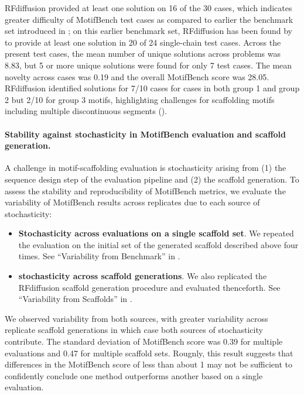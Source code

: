 RFdiffusion provided at least one solution on 16 of the 30 cases, which indicates greater difficulty of MotifBench test cases as compared to earlier the benchmark set introduced in \citep{watson2022broadly};
on this earlier benchmark set, RFdiffusion has been found by \citet{watson2022broadly, yim2024improved,zhang2023protein} to provide at least one solution in 20 of 24 single-chain test cases.  Across the present test cases, the mean number of unique solutions across problems was 8.83, but 5 or more unique solutions were found for only 7 test cases. The mean novelty across cases was 0.19 and the overall MotifBench score was 28.05. RFdiffusion identified solutions for 7/10 cases for cases in both group 1 and group 2 but 2/10 for group 3 motifs, highlighting challenges for scaffolding motifs including multiple discontinuous segments ().


\paragraph{Stability against stochasticity in MotifBench evaluation and scaffold generation.} A challenge in motif-scaffolding evaluation is stochasticity arising from (1) the sequence design step of the evaluation pipeline and (2) the scaffold generation. To assess the stability and reproducibility of MotifBench metrics, we evaluate the variability of MotifBench results across replicates due to each source of stochasticity:
{\begin{itemize}
    \item \textbf{Stochasticity across evaluations on a single scaffold set}. We repeated the evaluation on the initial set of the generated scaffold described above four times. See ``Variability from Benchmark'' in .
    \item \textbf{stochasticity across scaffold generations}. We also replicated the RFdiffusion scaffold generation procedure and evaluated thenceforth. See ``Variability from Scaffolds'' in .
\end{itemize}}

We observed variability from both sources, with greater variability across replicate scaffold generations in which case both sources of stochasticity contribute. The standard deviation of MotifBench score was 0.39 for multiple evaluations and 0.47 for multiple scaffold sets. Rougnly, this result suggests that differences in the MotifBench score of less than about 1 may not be sufficient to confidently conclude one method outperforms another based on a single evaluation.

